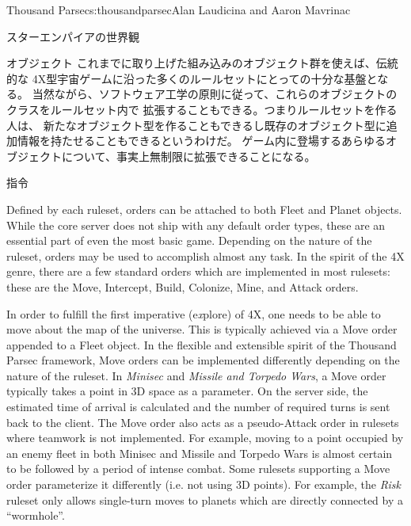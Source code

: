 \begin{aosachapter}{Thousand Parsec}{s:thousandparsec}{Alan Laudicina and Aaron Mavrinac}
\begin{aosasect1}{スターエンパイアの世界観}
\begin{aosasect2}{オブジェクト}
これまでに取り上げた組み込みのオブジェクト群を使えば、伝統的な
4X型宇宙ゲームに沿った多くのルールセットにとっての十分な基盤となる。
当然ながら、ソフトウェア工学の原則に従って、これらのオブジェクトのクラスをルールセット内で
拡張することもできる。つまりルールセットを作る人は、
新たなオブジェクト型を作ることもできるし既存のオブジェクト型に追加情報を持たせることもできるというわけだ。
ゲーム内に登場するあらゆるオブジェクトについて、事実上無制限に拡張できることになる。

\end{aosasect2}

\begin{aosasect2}{指令}

Defined by each ruleset, orders can be attached to both Fleet and
Planet objects. While the core server does not ship with any default
order types, these are an essential part of even the most basic
game. Depending on the nature of the ruleset, orders may be used to
accomplish almost any task. In the spirit of the 4X genre, there are a
few standard orders which are implemented in most rulesets: these are
the Move, Intercept, Build, Colonize, Mine, and Attack orders.

In order to fulfill the first imperative (e\emph{x}plore) of 4X, one
needs to be able to move about the map of the universe. This is
typically achieved via a Move order appended to a Fleet object. In the
flexible and extensible spirit of the Thousand Parsec framework, Move
orders can be implemented differently depending on the nature of the
ruleset. In \emph{Minisec} and \emph{Missile and Torpedo Wars}, a Move
order typically takes a point in 3D space as a parameter. On the
server side, the estimated time of arrival is calculated and the
number of required turns is sent back to the client. The Move order
also acts as a pseudo-Attack order in rulesets where teamwork is not
implemented. For example, moving to a point occupied by an enemy fleet
in both Minisec and Missile and Torpedo Wars is almost certain to be
followed by a period of intense combat. Some rulesets supporting a Move
order parameterize it differently (i.e. not using 3D points). For
example, the \emph{Risk} ruleset only allows single-turn moves to
planets which are directly connected by a ``wormhole''.


\end{aosasect2}
\end{aosasect1}
\end{aosachapter}
